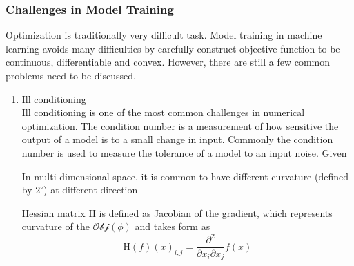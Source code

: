 \subsubsection{Challenges in Model Training}

Optimization is traditionally very difficult task. Model training in machine learning avoids many difficulties by carefully construct objective function to be continuous, differentiable and convex. However, there are still a few common problems need to be discussed. 

\begin{enumerate}
    \item Ill conditioning\\
Ill conditioning is one of the most common challenges in numerical optimization. The condition number is a measurement of how sensitive the output of a model is to a small change in input. Commonly the condition number is used to measure the tolerance of a model to an input noise.  Given 

In multi-dimensional space, it is common to have different curvature (defined by $2^\circ$) at different direction 

Hessian matrix $\mathrm{H}$ is defined as Jacobian of the gradient, which represents curvature of the $\mathcal{Obj}(\phi)$ and takes form as 
\begin{equation}
    \mathrm{H}(f)(x)_{i,j} = \frac{\partial^2}{\partial x_i \partial x_j}f(x)
\end{equation}


\end{enumerate}

